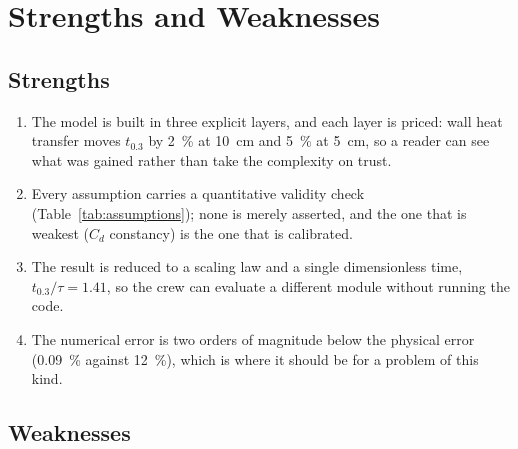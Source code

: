 \section{Strengths and Weaknesses}
\label{sec:sw}

\subsection*{Strengths}

\begin{enumerate}[label=(\arabic*),leftmargin=*]
  \item The model is built in three explicit layers, and each layer is
        priced: wall heat transfer moves $t_{0.3}$ by \SI{2}{\percent} at
        \SI{10}{cm} and \SI{5}{\percent} at \SI{5}{cm}, so a reader can see
        what was gained rather than take the complexity on trust.
  \item Every assumption carries a quantitative validity check
        (Table~\ref{tab:assumptions}); none is merely asserted, and the
        one that is weakest ($C_d$ constancy) is the one that is
        calibrated.
  \item The result is reduced to a scaling law and a single dimensionless
        time, $t_{0.3}/\tau=1.41$, so the crew can evaluate a different
        module without running the code.
  \item The numerical error is two orders of magnitude below the physical
        error (\SI{0.09}{\percent} against \SI{12}{\percent}), which is
        where it should be for a problem of this kind.
\end{enumerate}

\subsection*{Weaknesses}

